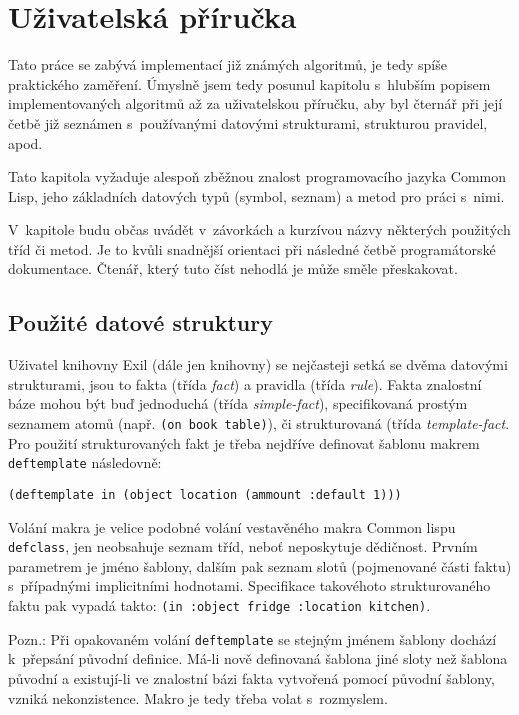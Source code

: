 \section{Uživatelská příručka}
Tato práce se zabývá implementací již známých algoritmů, je tedy spíše
praktického zaměření. Úmyslně jsem tedy posunul kapitolu s~hlubším popisem
implementovaných algoritmů až za uživatelskou příručku, aby byl čternář při
její četbě již seznámen s~používanými datovými strukturami, strukturou
pravidel, apod.

Tato kapitola vyžaduje alespoň zběžnou znalost programovacího jazyka
Common Lisp, jeho základních datových typů (symbol, seznam) a metod pro
práci s~nimi.

V~kapitole budu občas uvádět v~závorkách a kurzívou názvy některých použitých
tříd či metod. Je to kvůli snadnější orientaci při následné četbě programátorské
dokumentace. Čtenář, který tuto číst nehodlá je může směle přeskakovat.
\subsection{Použité datové struktury}
Uživatel knihovny Exil (dále jen knihovny) se nejčasteji setká se dvěma datovými
strukturami, jsou to fakta (třída \emph{fact}) a pravidla (třída \emph{rule}).
Fakta znalostní báze mohou být buď jednoduchá (třída \emph{simple-fact}),
specifikovaná prostým seznamem atomů (např. \verb|(on book table)|), či
strukturovaná (třída \emph{template-fact}. Pro použití strukturovaných fakt je
třeba nejdříve definovat šablonu makrem \verb|deftemplate| následovně:
\begin{verbatim}
(deftemplate in (object location (ammount :default 1)))
\end{verbatim}
Volání makra je velice podobné volání vestavěného makra Common lispu
\verb|defclass|, jen neobsahuje seznam tříd, neboť neposkytuje dědičnost.
Prvním parametrem je jméno šablony, dalším pak seznam slotů (pojmenované
části faktu) s~případnými implicitními hodnotami. Specifikace takovéhoto
 strukturovaného faktu pak vypadá takto:
\verb|(in :object fridge :location kitchen)|.

Pozn.: Při opakovaném volání \verb|deftemplate| se stejným jménem šablony
dochází k~přepsání původní definice. Má-li nově definovaná šablona jiné sloty
než šablona původní a existují-li ve znalostní bázi fakta vytvořená pomocí
původní šablony, vzniká nekonzistence. Makro je tedy třeba volat s~rozmyslem.


